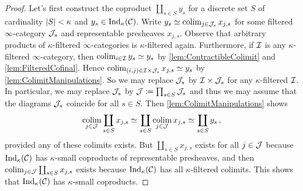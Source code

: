 \begin{proof}
	Let's first construct the coproduct $\coprod_{s\in S}y_s$ for a discrete set $S$ of cardinality $\abs*{S}<\kappa$ and $y_s\in\mathrm{Ind}_\kappa(\mathcal{C})$. Write $y_s\simeq \operatorname*{colim}_{j\in \mathcal{J}_s}x_{j,s}$ for some filtered $\infty$-category $\mathcal{J}_s$ and representable presheaves $x_{j,s}$. Observe that arbitrary products of $\kappa$-filtered $\infty$-categories is $\kappa$-filtered again. Furthermore, if $\mathcal{I}$ is any $\kappa$-filtered $\infty$-category, then $\operatorname*{colim}_{i\in\mathcal{I}}y_s\simeq y_s$ by \cref{lem:ContractibleColimit} and \cref{lem:FilteredCofinal}. Hence  $\operatorname*{colim}_{(i,j)\in \mathcal{I}\times\mathcal{J}_s}x_{j,s}\simeq y_s$ by \cref{lem:ColimitManipulations}. So we may replace $\mathcal{J}_s$ by $\mathcal{I}\times\mathcal{J}_s$ for any $\kappa$-filtered $\mathcal{I}$. In particular, we may replace $\mathcal{J}_s$ by $\mathcal{J}\coloneqq \prod_{s\in S}\mathcal{J}_s$ and thus we may assume that the diagrams $\mathcal{J}_s$ coincide for all $s\in S$. Then \cref{lem:ColimitManipulations} shows
	\begin{equation*}
		\operatorname*{colim}_{j\in\mathcal{J}}\coprod_{s\in S}x_{j,s}\simeq \coprod_{s\in S}\operatorname*{colim}_{j\in\mathcal{J}}x_{j,s}\simeq \coprod_{s\in S}y_s\,,
	\end{equation*}
	provided any of these colimits exists. But $\coprod_{s\in S}x_{j,s}$ exists for all $j\in \mathcal{J}$ because $\mathrm{Ind}_\kappa(\mathcal{C})$ has $\kappa$-small coproducts of representable presheaves, and then $\operatorname*{colim}_{j\in\mathcal{J}}\coprod_{s\in S}x_{j,s}$ exists because $\mathrm{Ind}_\kappa(\mathcal{C})$ has all $\kappa$-filtered colimits. This shows that $\mathrm{Ind}_\kappa(\mathcal{C})$ has $\kappa$-small coproducts.
	

\end{proof}
